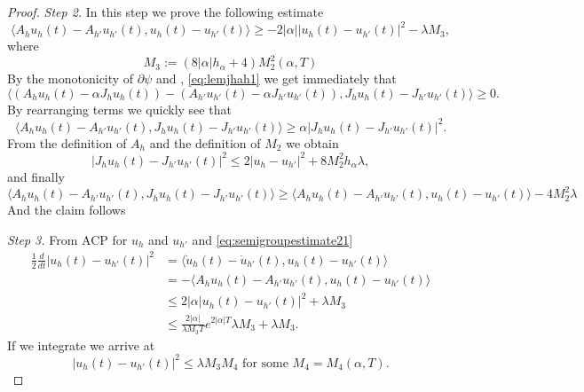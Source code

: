 \documentclass[a4paper,11pt, leqno]{scrreprt} %
\renewcommand{\leq}{\leqslant}
\renewcommand{\leq}{\leqslant}
\renewcommand{\geq}{\geqslant}
\theoremstyle{change}
\theoremstyle{nonumberplain}
\newtheorem{proof}{Proof}
\begin{document}
\begin{proof}
  \textit{Step 2.} In this step we prove the following estimate
  \begin{equation}
    \label{eq:semigroupestimate21}
    \langle A_h u_h(t) - A_{h'} u_{h'}(t), u_h(t) - u_{h'}(t) \rangle
    \geq -2 |\alpha| |u_h(t) - u_{h'}(t)|^2 - \lambda M_3,
  \end{equation}
  where
  \begin{equation}
    \label{eq:semigroupestimate22}
    M_3 := (8 |\alpha| h_\alpha + 4)M_2^2(\alpha, T)
  \end{equation}
  By the monotonicity of $\partial \psi$ and ,
  \eqref{eq:lemjhah1} we get immediately that
  \begin{equation*}
    \langle (A_h u_h(t) - \alpha J_h u_h(t)) - (A_{h'} u_{h'}(t) -
    \alpha J_{h'} u_{h'}(t)), J_h u_h(t) - J_{h'} u_{h'}(t) \rangle
    \geq 0.
  \end{equation*}
  By rearranging terms we quickly see that
  \begin{equation*}
     \langle A_h u_h(t) - A_{h'} u_{h'}(t), J_h u_h(t) - J_{h'} u_{h'}(t) \rangle
    \geq \alpha |J_h u_h(t) - J_{h'} u_{h'}(t)|^2.
  \end{equation*}
  From the definition of $A_h$ and the definition of $M_2$ we obtain
  \begin{equation*}
    |J_h u_h(t) - J_{h'}u_{h'}(t)|^2 \leq 2|u_h - u_{h'}|^2 + 8M_2^2
    h_\alpha \lambda,
  \end{equation*}
  and finally 
  \begin{equation*}
    \langle A_h u_h(t) - A_{h'} u_{h'}(t), J_h u_h(t) - J_{h'}
    u_{h'}(t) \rangle \geq \langle A_h u_h(t) - A_{h'} u_{h'}(t),
    u_h(t) - u_{h'}(t) \rangle - 4 M_2^2 \lambda
  \end{equation*}
  And the claim follows 

  \textit{Step 3.} From ACP for $u_{h}$ and $u_{h'}$ and
  \eqref{eq:semigroupestimate21}
  \begin{equation*}
    \begin{split}
      \frac12 \frac{d}{dt} |u_h(t) - u_{h'}(t)|^2 &= \langle \dot u_h(t)
      - \dot u_{h'}(t), u_h(t) - u_{h'}(t) \rangle\\
      &=-\langle A_h u_h(t) - A_{h'} u_{h'}(t), u_h(t) - u_{h'}(t)
      \rangle\\
      &\leq 2 | \alpha |u_h(t) - u_{h'}(t)|^2 + \lambda M_3\\
      &\leq \frac{2 |\alpha|}{\lambda M_3 T} e^{2 |\alpha| T} \lambda M_3 + \lambda M_3.
    \end{split}
  \end{equation*}
  If we integrate we arrive at
  \begin{equation}
    \label{eq:semigroupestimate31}
    |u_h(t) - u_{h'}(t)|^2 \leq \lambda M_3 M_4 \text{ for some $M_4 =
      M_4(\alpha, T)$.}
  \end{equation}


\end{proof}
\end{document}
